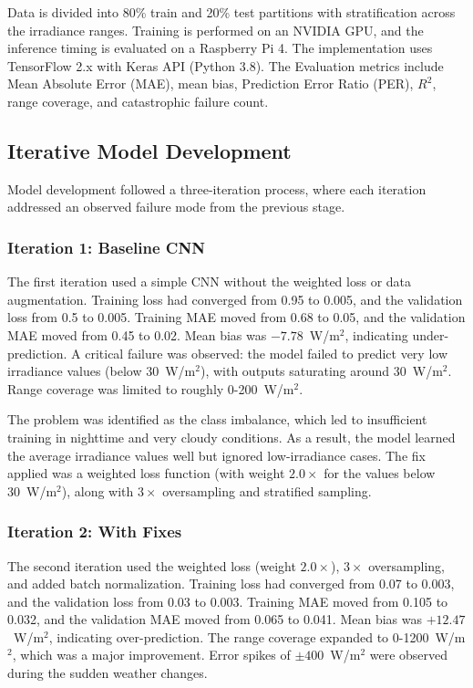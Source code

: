 \documentclass[journal]{IEEEtran}
\begin{document}
Data is divided into 80\% train and 20\% test partitions with stratification across the irradiance ranges. Training is performed on an NVIDIA GPU, and the inference timing is evaluated on a Raspberry Pi 4. The implementation uses TensorFlow 2.x with Keras API (Python 3.8). The Evaluation metrics include Mean Absolute Error (MAE), mean bias, Prediction Error Ratio (PER), $R^2$, range coverage, and catastrophic failure count.

\subsection{Iterative Model Development}
Model development followed a three-iteration process, where each iteration addressed an observed failure mode from the previous stage.

\subsubsection{Iteration 1: Baseline CNN}
The first iteration used a simple CNN without the weighted loss or data augmentation. Training loss had converged from 0.95 to 0.005, and the validation loss from 0.5 to 0.005. Training MAE moved from 0.68 to 0.05, and the validation MAE moved from 0.45 to 0.02. Mean bias was $-7.78$~W/m$^2$, indicating under-prediction. A critical failure was observed: the model failed to predict very low irradiance values (below 30~W/m$^2$), with outputs saturating around 30~W/m$^2$. Range coverage was limited to roughly 0-200~W/m$^2$.

The problem was identified as the class imbalance, which led to insufficient training in nighttime and very cloudy conditions. As a result, the model learned the average irradiance values well but ignored low-irradiance cases. The fix applied was a weighted loss function (with weight $2.0\times$ for the values below 30~W/m$^2$), along with $3\times$ oversampling and stratified sampling.

\subsubsection{Iteration 2: With Fixes}
The second iteration used the weighted loss (weight $2.0\times$), $3\times$ oversampling, and added batch normalization. Training loss had converged from 0.07 to 0.003, and the validation loss from 0.03 to 0.003. Training MAE moved from 0.105 to 0.032, and the validation MAE moved from 0.065 to 0.041. Mean bias was $+12.47$~W/m$^2$, indicating over-prediction. The range coverage expanded to 0-1200~W/m$^2$, which was a major improvement. Error spikes of $\pm400$~W/m$^2$ were observed during the sudden weather changes.
\end{document}
